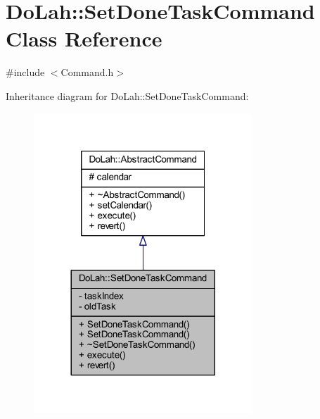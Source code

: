 \hypertarget{class_do_lah_1_1_set_done_task_command}{}\section{Do\+Lah\+:\+:Set\+Done\+Task\+Command Class Reference}
\label{class_do_lah_1_1_set_done_task_command}


{\ttfamily \#include $<$Command.\+h$>$}



Inheritance diagram for Do\+Lah\+:\+:Set\+Done\+Task\+Command\+:\nopagebreak
\begin{figure}[H]
\begin{center}
\leavevmode
\includegraphics[width=233pt]{class_do_lah_1_1_set_done_task_command__inherit__graph}
\end{center}
\end{figure}


